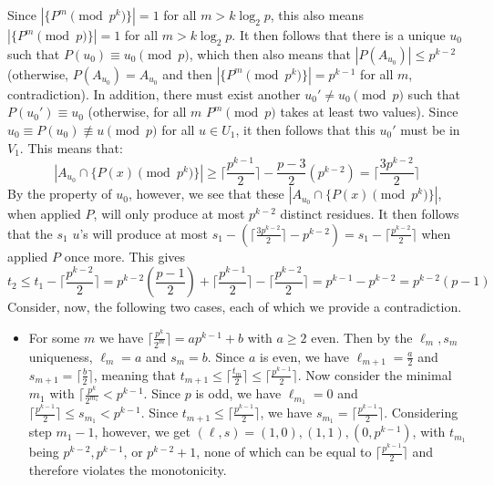 \documentclass[11pt,a4paper]{article}
\begin{document}
\begin{enumerate}
        Since $|\{P^m\pmod{p^k}\}|=1$ for all $m> k\log_2 p$, 
        this also means $|\{P^m\pmod{p}\}|=1$ for all $m> k\log_2 p$. 
        It then follows that there is a unique $u_0$ such that $P(u_0)\equiv u_0\pmod{p}$, 
        which then also means that $|P(A_{u_0})|\le p^{k-2}$ 
        (otherwise, $P(A_{u_0})=A_{u_0}$ and then $|\{P^m\pmod{p^k}\}|=p^{k-1}$ for all $m$, contradiction). 
        In addition, there must exist another $u_0'\neq u_0\pmod{p}$ such that $P(u_0')\equiv u_0$ 
        (otherwise, for all $m$ $P^m\pmod{p}$ takes at least two values). 
        Since $u_0\equiv P(u_0)\not\equiv u\pmod{p}$ for all $u\in U_1$, 
        it then follows that this $u_0'$ must be in $V_1$. 
        This means that: 
        \[
        |A_{u_0}\cap \{P(x)\pmod{p^k}\}|
        \ge \lceil \frac{p^{k-1}}{2}\rceil - \frac{p-3}{2}(p^{k-2}) = \lceil \frac{3p^{k-2}}{2}\rceil
        \]
        By the property of $u_0$, however, we see that these $|A_{u_0}\cap \{P(x)\pmod{p^k}\}|$, 
        when applied $P$, will only produce at most $p^{k-2}$ distinct residues. 
        It then follows that the $s_1$ $u$'s will produce at most $s_1 - (\lceil \frac{3p^{k-2}}{2}\rceil - p^{k-2})
        =s_1 - \lceil \frac{p^{k-2}}{2}\rceil$ when applied $P$ once more. 
        This gives 
        \[
        t_2 \le t_1 - \lceil \frac{p^{k-2}}{2}\rceil 
        = p^{k-2}(\frac{p-1}{2}) + \lceil \frac{p^{k-1}}{2}\rceil - \lceil \frac{p^{k-2}}{2}\rceil 
        =p^{k-1} - p^{k-2}
        =p^{k-2}(p - 1)
        \]
        Consider, now, the following two cases, each of which we provide a contradiction. 
        \begin{itemize}
        	\item For some $m$ we have $\lceil \frac{p^k}{2^m}\rceil = ap^{k-1}+b$ with $a\ge 2$ even. 
        	Then by the $\ell_{m}, s_m$ uniqueness, 
        	$\ell_m = a$ and $s_m = b$. 
        	Since $a$ is even, 
        	we have $\ell_{m+1} = \frac{a}{2}$ and $s_{m+1}=\lceil \frac{b}{2}\rceil$, 
        	meaning that 
        	$t_{m+1} \le \lceil \frac{t_m}{2}\rceil \le \lceil \frac{p^{k-1}}{2}\rceil$. 
        	Now consider the minimal $m_1$ with $\lceil \frac{p^k}{2^{m_1}} < p^{k-1}$. 
        	Since $p$ is odd, 
        	we have $\ell_{m_1}=0$ and 
        	$\lceil\frac{p^{k-1}}{2}\rceil\le s_{m_1} < p^{k-1}$.  
        	Since $t_{m+1} \le \lceil \frac{p^{k-1}}{2}\rceil$, 
        	we have $s_{m_1}=\lceil\frac{p^{k-1}}{2}\rceil$. 
        	Considering step $m_1 - 1$, however, 
        	we get $(\ell, s)=(1, 0), (1, 1), (0, p^{k-1})$, with 
        	$t_{m_1}$ being $p^{k-2}, p^{k-1}$, or $p^{k-2} + 1$, 
        	none of which can be equal to $\lceil \frac{p^{k-1}}{2}\rceil$ and therefore violates the monotonicity. 
        	

\end{itemize}
\end{enumerate}
\end{document}
